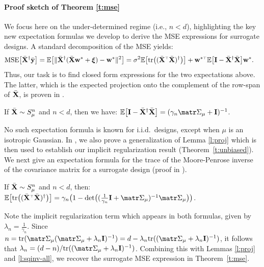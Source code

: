 \documentclass[../../thesis.tex]{subfiles}
\begin{document}
\paragraph{Proof sketch of Theorem \ref{t:mse}}
We focus here on the under-determined regime (i.e., $n<d$),
highlighting the key new expectation formulas we develop to derive the
MSE expressions for surrogate designs. A standard decomposition of the MSE yields:
\begin{align}
  \MSE{\Xb^\dagger\ybb}
   & = \E\big[\|\Xb^\dagger(\Xb\w^*+\xib)-\w^*\|^2\big]
  =\sigma^2\E\big[\tr\big((\Xb^\top\Xb)^{\dagger}\big)\big] +
  \w^{*\top}\E\big[\I-\Xb^\dagger\Xb\big]\w^*.\label{eq:mse-derivation}
\end{align}
Thus, our task is to find closed form expressions for the two
expectations above. The latter, which is the expected projection onto
the complement of the row-span of ${\bar{\mathbf X}}$, is proven in
.
\begin{lemma}\label{l:proj}
  If  ${\bar{\mathbf X}}\sim S_\mu^n$ and $n<d$, then we have:
  $\E\big[\I-\Xb^\dagger\Xb\big] = (\gamma_n\Sigmab_\mu+\I)^{-1}$.
\end{lemma}

\noindent
No such expectation formula is known for i.i.d.~designs, except when
$\mu$ is an isotropic Gaussian. In , we
also prove a generalization of Lemma \ref{l:proj} which is then used
to establish our implicit regularization result
(Theorem~\ref{t:unbiased}). We next give an expectation formula
for the trace of the Moore-Penrose inverse of the covariance
matrix for a surrogate design (proof in ).
\begin{lemma}\label{l:sqinv-all}
  If  ${\bar{\mathbf X}}\sim S_\mu^n$ and $n<d$, then:
  $\E\big[\tr\big((\Xb^\top\Xb)^{\dagger}\big)\big]
    =\gamma_n\big(1-
    \det\!\big((\tfrac1{\gamma_n}\I+\Sigmab_\mu)^{-1}\Sigmab_\mu\big)\big)$.
\end{lemma}

\noindent
Note the implicit regularization term which appears in both formulas,
given by $\lambda_n=\frac1{\gamma_n}$. Since $n =
  \tr(\Sigmab_\mu(\Sigmab_\mu+\lambda_n\I)^{-1})=d-\lambda_n\tr((\Sigmab_\mu+\lambda_n\I)^{-1})$,
it follows that $\lambda_n=(d-n)/\tr((\Sigmab_\mu+\lambda_n\I)^{-1})$.
Combining this with Lemmas \ref{l:proj} and \ref{l:sqinv-all}, we
recover the surrogate MSE expression in Theorem~\ref{t:mse}.
\end{document}
